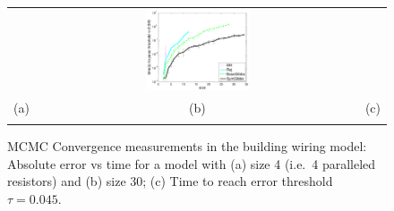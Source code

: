 \documentclass[]{article}
\newcommand{\nnn}{0.33}
\newcommand{\nnh}{0.23}
\begin{document}
\begin{figure}[t!]
\begin{center}
\begin{tabular}{ccc}
& \hspace{-3mm} \includegraphics[width=\nnn\textwidth, height=\nnh\textwidth]{plotsx/conductancex/time_vs_param-errorbar.pdf}
\vspace{-1.5mm}
\\
\hspace{-5mm} \footnotesize(a) 
& \hspace{-4mm} \footnotesize(b) 
& \hspace{-3mm} \footnotesize(c) \\
\multicolumn{3}{c}{}
\end{tabular}
\end{center}
\vspace{-8mm}
\caption{\footnotesize 
MCMC Convergence measurements in the building wiring model: 
Absolute error vs time for a model with (a) size 4 (i.e.\ 4 paralleled resistors) and (b) size 30; (c) Time to reach error threshold $\tau=0.045$.}
\label{fig:resistor}
\vspace{-4mm}
\end{figure}
\end{document}
